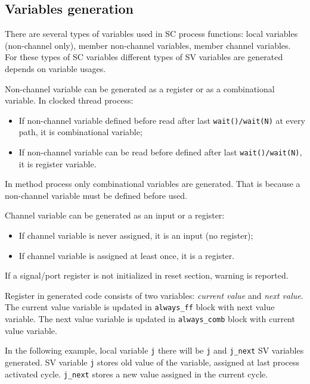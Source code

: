 \subsection{Variables generation}\label{section:var_gen}

There are several types of variables used in SC process functions: local variables (non-channel only), member non-channel variables, member channel variables. For these types of SC variables different types of SV variables are generated depends on variable usages. 

Non-channel variable can be generated as a register or as a combinational variable. In clocked thread process:
%
\begin{itemize}
\item If non-channel variable defined before read after last {\tt wait()/wait(N)} at every path, it is combinational variable;
\item If non-channel variable can be read before defined after last {\tt wait()/wait(N)}, it is register variable.
\end{itemize}
%
In method process only combinational variables are generated. That is because a  non-channel variable must be defined before used. 

Channel variable can be generated as an input or a register:
%
\begin{itemize}
\item If channel variable is never assigned, it is an input (no register);
\item If channel variable is assigned at least once, it is a register.
\end{itemize}
%
If a signal/port register is not initialized in reset section, warning is reported.

Register in generated code consists of two variables: \emph{current value} and \emph{next value}. The current value variable is updated in {\tt always\_ff} block with next value variable. The next value variable is updated in {\tt always\_comb} block with current value variable.

In the following example, local variable {\tt j} there will be {\tt j} and {\tt j\_next} SV variables generated. SV variable {\tt j} stores old value of the variable, assigned at last process activated cycle. {\tt j\_next} stores a new value assigned in the current cycle.

